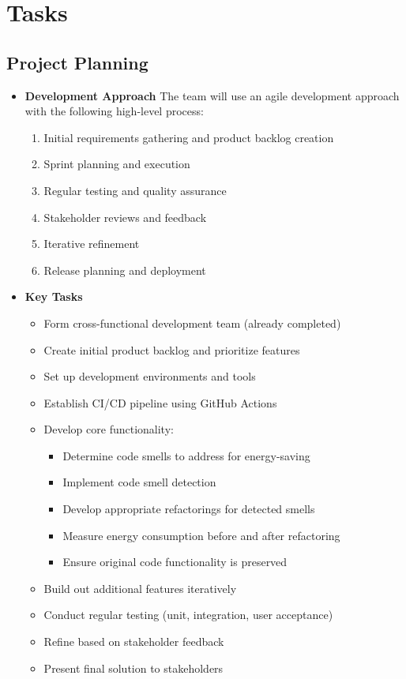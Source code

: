\documentclass[12pt]{article}
\begin{document}
\section{Tasks}
\subsection{Project Planning}
\begin{itemize}

  \item \textbf{Development Approach}
    The team will use an agile development approach with the
    following high-level process:
    \begin{enumerate}
      \item Initial requirements gathering and product backlog creation
      \item Sprint planning and execution
      \item Regular testing and quality assurance
      \item Stakeholder reviews and feedback
      \item Iterative refinement
      \item Release planning and deployment
    \end{enumerate}

  \item \textbf{Key Tasks}
    \begin{itemize}
      \item Form cross-functional development team (already completed)
      \item Create initial product backlog and prioritize features
      \item Set up development environments and tools
      \item Establish CI/CD pipeline using GitHub Actions
      \item Develop core functionality:
        \begin{itemize}
          \item Determine code smells to address for energy-saving
          \item Implement code smell detection
          \item Develop appropriate refactorings for detected smells
          \item Measure energy consumption before and after refactoring
          \item Ensure original code functionality is preserved
        \end{itemize}
      \item Build out additional features iteratively
      \item Conduct regular testing (unit, integration, user acceptance)
      \item Refine based on stakeholder feedback
      \item Present final solution to stakeholders


\end{itemize}
\end{itemize}
\end{document}
